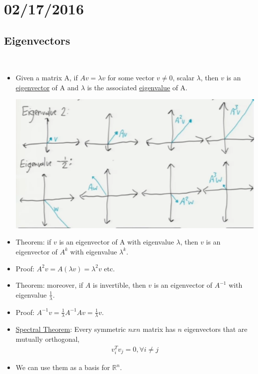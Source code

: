 \documentclass[10pt]{article}
\begin{document}
\section*{02/17/2016}
	\subsection*{Eigenvectors}
	\
		\begin{itemize}
			\item Given a matrix A, if $Av = \lambda v$ for some vector $v \neq 0$, scalar $\lambda$, then $v$ is an \underline{eigenvector} of A and $\lambda$ is the associated \underline{eigenvalue} of A.
			
				\begin{center}
					\includegraphics[scale=0.5]{../images/eigenvectors}
				\end{center}
			\item Theorem: if $v$ is an eigenvector of A with eigenvalue $\lambda$, then $v$ is an eigenvector of $A^{k}$ with eigenvalue $\lambda^{k}$.
			\item Proof: $A^{2}v = A(\lambda v) = \lambda^{2}v$ etc.
			\item Theorem: moreover, if $A$ is invertible, then $v$ is an eigenvector of $A^{-1}$ with eigenvalue $\frac{1}{\lambda}$.
			\item Proof: $A^{-1}v = \frac{1}{\lambda}A^{-1}Av = \frac{1}{\lambda}v$.
			\item \underline{Spectral Theorem}: Every symmetric $nxn$ matrix has $n$ eigenvectors that are mutually orthogonal,
				\begin{align*}
					v_{i}^{T}v_{j} = 0, \forall i\neq j
				\end{align*}
			\item We can use them as a basis for $\mathbb{R}^{n}$.
				\begin{center}

\end{center}
\end{itemize}
\end{document}
